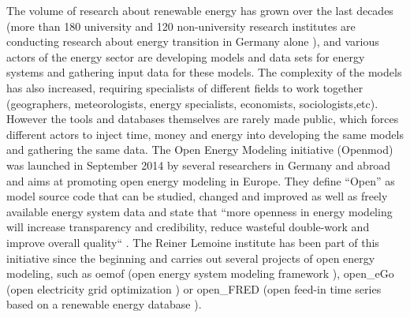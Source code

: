 The volume of research about renewable energy has grown over the last decades (more than 180 university and 120 non-university research institutes are conducting research about energy transition in Germany alone \cite{bmbf_energiewende}), and various actors of the energy sector are developing models and data sets for energy systems and gathering input data for these models. The complexity of the models has also increased, requiring specialists of different fields to work together (geographers, meteorologists, energy specialists, economists, sociologists,etc). However the tools and databases themselves are rarely made public, which forces different actors to inject time, money and energy into developing the same models and gathering the same data. \newline
The Open Energy Modeling initiative (Openmod) was launched in September 2014 by several researchers in Germany and abroad \cite{openmod_workshop} and aims at promoting open energy modeling in Europe. They define “Open” as model source code that can be studied, changed and improved as well as freely available energy system data and state that ``more openness in energy modeling will increase transparency and credibility, reduce wasteful double-work and improve overall quality`` \cite{openmod_manifesto}. \newline
The Reiner Lemoine institute has been part of this initiative since the beginning and  carries out several projects of open energy modeling, such as oemof (open energy system modeling framework \cite{rli_oemof}), open\_eGo (open electricity grid optimization \cite{rli_openego}) or open\_FRED (open feed-in time series based on a renewable energy database \cite{rli_openfred}). 


